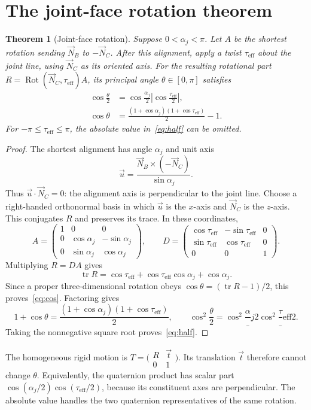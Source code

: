 \documentclass[11pt,letterpaper]{article}
\newtheorem{theorem}{Theorem}
\newcommand{\NB}{\vec N_B}
\newcommand{\NC}{\vec N_C}
\newcommand{\Rot}{\operatorname{Rot}}
\newcommand{\tr}{\operatorname{tr}}
\newcommand{\eff}{\tau_{\mathrm{eff}}}
\newcommand{\aj}{\alpha_j}
\newcommand{\uu}{\vec u}
\begin{document}
\newpage
\section{The joint-face rotation theorem}\label{sec:proof}
\begin{theorem}[Joint-face rotation]
Suppose $0<\aj<\pi$. Let $A$ be the shortest rotation sending $\NB$ to
$-\NC$. After this alignment, apply a twist $\eff$ about the joint line,
using $\NC$ as its oriented axis. For the resulting rotational part
$R=\Rot(\NC,\eff)A$, its principal angle $\theta\in[0,\pi]$ satisfies
\begin{align}
  \cos\frac{\theta}{2}
    &=\cos\frac{\aj}{2}\left|\cos\frac{\eff}{2}\right|,\label{eq:half}\\
  \cos\theta
    &=\frac{(1+\cos\aj)(1+\cos\eff)}{2}-1.\label{eq:cos}
\end{align}
For $-\pi\leq\eff\leq\pi$, the absolute value in~\eqref{eq:half}
can be omitted.
\end{theorem}

\begin{proof}
The shortest alignment has angle $\aj$ and unit axis
\[
  \uu=\frac{\NB\times(-\NC)}{\sin\aj}.
\]
Thus $\uu\cdot\NC=0$: the alignment axis is perpendicular to the
joint line. Choose a right-handed orthonormal basis in which $\uu$ is
the $x$-axis and $\NC$ is the $z$-axis. This conjugates $R$ and preserves
its trace. In these coordinates,
\[
  A=\begin{pmatrix}
    1&0&0\\0&\cos\aj&-\sin\aj\\0&\sin\aj&\cos\aj
  \end{pmatrix},\qquad
  D=\begin{pmatrix}
    \cos\eff&-\sin\eff&0\\\sin\eff&\cos\eff&0\\0&0&1
  \end{pmatrix}.
\]
Multiplying $R=DA$ gives
\[
  \tr R=\cos\eff+\cos\eff\cos\aj+\cos\aj.
\]
Since a proper three-dimensional rotation obeys
$\cos\theta=(\tr R-1)/2$, this proves~\eqref{eq:cos}. Factoring gives
\[
  1+\cos\theta=\frac{(1+\cos\aj)(1+\cos\eff)}2,
  \qquad
  \cos^2\frac\theta2=\cos^2\frac\aj2\cos^2\frac\eff2.
\]
Taking the nonnegative square root proves~\eqref{eq:half}.
\end{proof}

The homogeneous rigid motion is $T=\bigl(\begin{smallmatrix}R&\vec t\\0&1\end{smallmatrix}\bigr)$.
Its translation $\vec t$ therefore cannot change $\theta$. Equivalently,
the quaternion product has scalar part
$\cos(\aj/2)\cos(\eff/2)$, because its constituent axes are perpendicular.
The absolute value handles the two quaternion representatives of the same
rotation.
\end{document}
